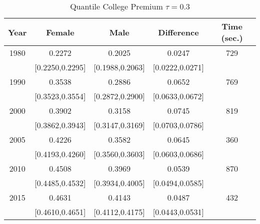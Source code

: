 \begin{table}[ht]
\centering
\begin{tabular}{ccccc}
  \hline
Year & Female & Male & Difference & Time (sec.) \\ 
  \hline
1980 & 0.2272 & 0.2025 & 0.0247 & 729 \\ 
   & [0.2250,0.2295] & [0.1988,0.2063] & [0.0222,0.0271] &  \\ 
  1990 & 0.3538 & 0.2886 & 0.0652 & 769 \\ 
   & [0.3523,0.3554] & [0.2872,0.2900] & [0.0633,0.0672] &  \\ 
  2000 & 0.3902 & 0.3158 & 0.0745 & 819 \\ 
   & [0.3862,0.3943] & [0.3147,0.3169] & [0.0703,0.0786] &  \\ 
  2005 & 0.4226 & 0.3582 & 0.0645 & 360 \\ 
   & [0.4193,0.4260] & [0.3560,0.3603] & [0.0603,0.0686] &  \\ 
  2010 & 0.4508 & 0.3969 & 0.0539 & 870 \\ 
   & [0.4485,0.4532] & [0.3934,0.4005] & [0.0494,0.0585] &  \\ 
  2015 & 0.4631 & 0.4143 & 0.0487 & 432 \\ 
   & [0.4610,0.4651] & [0.4112,0.4175] & [0.0443,0.0531] &  \\ 
   \hline
\end{tabular}
\caption{Quantile College Premium $\tau=0.3$} 
\end{table}

